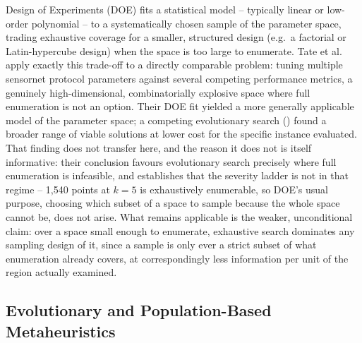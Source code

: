 Design of Experiments (DOE) fits a statistical model -- typically linear or
low-order polynomial -- to a systematically chosen sample of the parameter
space, trading exhaustive coverage for a smaller, structured design (e.g.\ a
factorial or Latin-hypercube design) when the space is too large to enumerate.
Tate et al.~\cite{R:Tate:2009a} apply exactly this trade-off to a
directly comparable problem: tuning multiple sensornet protocol parameters
against several competing performance metrics, a genuinely high-dimensional,
combinatorially explosive space where full enumeration is not an option. Their
DOE fit yielded a more generally applicable model of the parameter space; a
competing evolutionary search () found a broader range
of viable solutions at lower cost for the specific instance evaluated. That
finding does not transfer here, and the reason it does not is itself
informative: their conclusion favours evolutionary search precisely where full
enumeration is infeasible, and  establishes that the
severity ladder is not in that regime -- 1{,}540 points at $k=5$ is exhaustively
enumerable, so DOE's usual purpose, choosing which subset of a space to sample
because the whole space cannot be, does not arise. What remains applicable is
the weaker, unconditional claim: over a space small enough to enumerate,
exhaustive search dominates any sampling design of it, since a sample is only
ever a strict subset of what enumeration already covers, at correspondingly
less information per unit of the region actually examined.

\subsection{Evolutionary and Population-Based Metaheuristics}
\label{sec:evolutionary}


